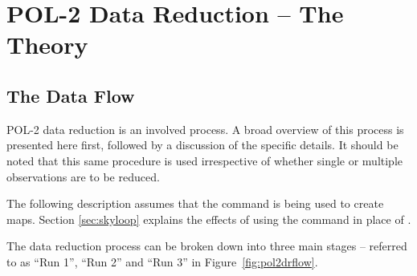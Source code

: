 \chapter{POL-2 Data Reduction -- The Theory}
\label{sec:dr}
\section{The Data Flow}

POL-2 data reduction is an involved process. A broad overview of this
process is presented here first, followed by a discussion of the specific
details. It should be noted that this same procedure is used irrespective
of whether single or multiple observations are to be reduced.

The following description assumes that the  command is
being used to create maps. Section \ref{sec:skyloop} explains the effects
of using the  command in place of .

The data reduction process can be broken down into three main stages --
referred to as ``Run 1'', ``Run 2'' and ``Run 3'' in Figure~\ref{fig:pol2drflow}.

